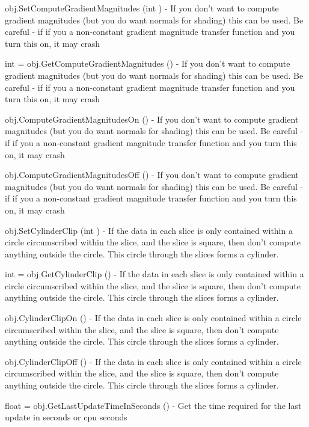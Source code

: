 \begin{DoxyItemize}
\item {\ttfamily obj.\-Set\-Compute\-Gradient\-Magnitudes (int )} -\/ If you don't want to compute gradient magnitudes (but you do want normals for shading) this can be used. Be careful -\/ if if you a non-\/constant gradient magnitude transfer function and you turn this on, it may crash  
\item {\ttfamily int = obj.\-Get\-Compute\-Gradient\-Magnitudes ()} -\/ If you don't want to compute gradient magnitudes (but you do want normals for shading) this can be used. Be careful -\/ if if you a non-\/constant gradient magnitude transfer function and you turn this on, it may crash  
\item {\ttfamily obj.\-Compute\-Gradient\-Magnitudes\-On ()} -\/ If you don't want to compute gradient magnitudes (but you do want normals for shading) this can be used. Be careful -\/ if if you a non-\/constant gradient magnitude transfer function and you turn this on, it may crash  
\item {\ttfamily obj.\-Compute\-Gradient\-Magnitudes\-Off ()} -\/ If you don't want to compute gradient magnitudes (but you do want normals for shading) this can be used. Be careful -\/ if if you a non-\/constant gradient magnitude transfer function and you turn this on, it may crash  
\item {\ttfamily obj.\-Set\-Cylinder\-Clip (int )} -\/ If the data in each slice is only contained within a circle circumscribed within the slice, and the slice is square, then don't compute anything outside the circle. This circle through the slices forms a cylinder.  
\item {\ttfamily int = obj.\-Get\-Cylinder\-Clip ()} -\/ If the data in each slice is only contained within a circle circumscribed within the slice, and the slice is square, then don't compute anything outside the circle. This circle through the slices forms a cylinder.  
\item {\ttfamily obj.\-Cylinder\-Clip\-On ()} -\/ If the data in each slice is only contained within a circle circumscribed within the slice, and the slice is square, then don't compute anything outside the circle. This circle through the slices forms a cylinder.  
\item {\ttfamily obj.\-Cylinder\-Clip\-Off ()} -\/ If the data in each slice is only contained within a circle circumscribed within the slice, and the slice is square, then don't compute anything outside the circle. This circle through the slices forms a cylinder.  
\item {\ttfamily float = obj.\-Get\-Last\-Update\-Time\-In\-Seconds ()} -\/ Get the time required for the last update in seconds or cpu seconds  

\end{DoxyItemize}
